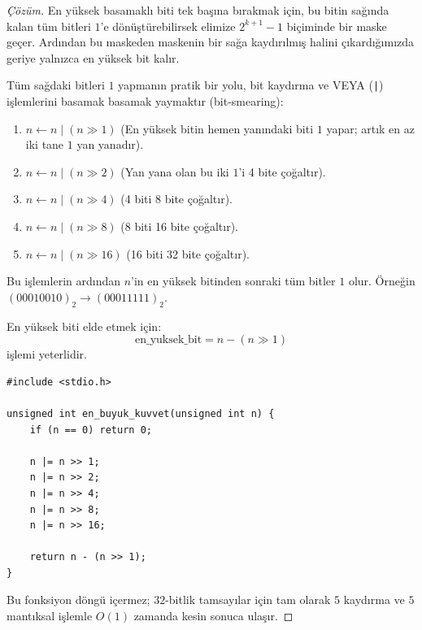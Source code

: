 \begin{proof}[Çözüm]
En yüksek basamaklı biti tek başına bırakmak için, bu bitin sağında kalan tüm bitleri $1$'e dönüştürebilirsek elimize $2^{k+1}-1$ biçiminde bir maske geçer. Ardından bu maskeden maskenin bir sağa kaydırılmış halini çıkardığımızda geriye yalnızca en yüksek bit kalır.

Tüm sağdaki bitleri $1$ yapmanın pratik bir yolu, bit kaydırma ve VEYA (\texttt{|}) işlemlerini basamak basamak yaymaktır (bit-smearing):
\begin{enumerate}
    \item $n \gets n \mid (n \gg 1)$ (En yüksek bitin hemen yanındaki biti $1$ yapar; artık en az iki tane $1$ yan yanadır).
    \item $n \gets n \mid (n \gg 2)$ (Yan yana olan bu iki $1$'i 4 bite çoğaltır).
    \item $n \gets n \mid (n \gg 4)$ (4 biti 8 bite çoğaltır).
    \item $n \gets n \mid (n \gg 8)$ (8 biti 16 bite çoğaltır).
    \item $n \gets n \mid (n \gg 16)$ (16 biti 32 bite çoğaltır).
\end{enumerate}
Bu işlemlerin ardından $n$'in en yüksek bitinden sonraki tüm bitler $1$ olur. Örneğin $(00010010)_2 \to (00011111)_2$.

En yüksek biti elde etmek için:
\[
\text{en\_yuksek\_bit} = n - (n \gg 1)
\]
işlemi yeterlidir.

\begin{lstlisting}[language=CTemel]
#include <stdio.h>

unsigned int en_buyuk_kuvvet(unsigned int n) {
    if (n == 0) return 0;
    
    n |= n >> 1;
    n |= n >> 2;
    n |= n >> 4;
    n |= n >> 8;
    n |= n >> 16;
    
    return n - (n >> 1);
}
\end{lstlisting}
Bu fonksiyon döngü içermez; $32$-bitlik tamsayılar için tam olarak $5$ kaydırma ve $5$ mantıksal işlemle $O(1)$ zamanda kesin sonuca ulaşır.
\end{proof}
